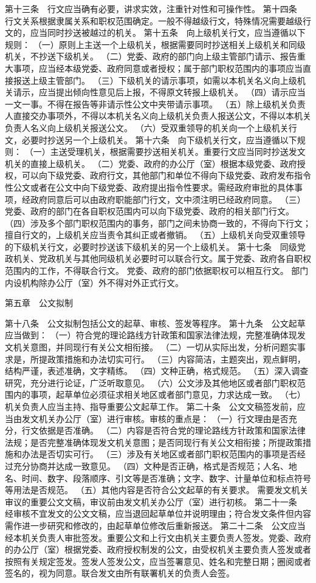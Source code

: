 \documentclass{gbt9704}
\begin{document}
第十三条　行文应当确有必要，讲求实效，注重针对性和可操作性。
第十四条　行文关系根据隶属关系和职权范围确定。一般不得越级行文，特殊情况需要越级行文的，应当同时抄送被越过的机关。
第十五条　向上级机关行文，应当遵循以下规则：
（一）原则上主送一个上级机关，根据需要同时抄送相关上级机关和同级机关，不抄送下级机关。
（二）党委、政府的部门向上级主管部门请示、报告重大事项，应当经本级党委、政府同意或者授权；属于部门职权范围内的事项应当直接报送上级主管部门。
（三）下级机关的请示事项，如需以本机关名义向上级机关请示，应当提出倾向性意见后上报，不得原文转报上级机关。
（四）请示应当一文一事。不得在报告等非请示性公文中夹带请示事项。
（五）除上级机关负责人直接交办事项外，不得以本机关名义向上级机关负责人报送公文，不得以本机关负责人名义向上级机关报送公文。
（六）受双重领导的机关向一个上级机关行文，必要时抄送另一个上级机关。
第十六条　向下级机关行文，应当遵循以下规则：
（一）主送受理机关，根据需要抄送相关机关。重要行文应当同时抄送发文机关的直接上级机关。
（二）党委、政府的办公厅（室）根据本级党委、政府授权，可以向下级党委、政府行文，其他部门和单位不得向下级党委、政府发布指令性公文或者在公文中向下级党委、政府提出指令性要求。需经政府审批的具体事项，经政府同意后可以由政府职能部门行文，文中须注明已经政府同意。
（三）党委、政府的部门在各自职权范围内可以向下级党委、政府的相关部门行文。
（四）涉及多个部门职权范围内的事务，部门之间未协商一致的，不得向下行文；擅自行文的，上级机关应当责令其纠正或者撤销。
（五）上级机关向受双重领导的下级机关行文，必要时抄送该下级机关的另一个上级机关。
第十七条　同级党政机关、党政机关与其他同级机关必要时可以联合行文。属于党委、政府各自职权范围内的工作，不得联合行文。
党委、政府的部门依据职权可以相互行文。
部门内设机构除办公厅（室）外不得对外正式行文。

第五章　公文拟制

第十八条　公文拟制包括公文的起草、审核、签发等程序。
第十九条　公文起草应当做到：
（一）符合党的理论路线方针政策和国家法律法规，完整准确体现发文机关意图，并同现行有关公文相衔接。
（二）一切从实际出发，分析问题实事求是，所提政策措施和办法切实可行。
（三）内容简洁，主题突出，观点鲜明，结构严谨，表述准确，文字精练。
（四）文种正确，格式规范。
（五）深入调查研究，充分进行论证，广泛听取意见。
（六）公文涉及其他地区或者部门职权范围内的事项，起草单位必须征求相关地区或者部门意见，力求达成一致。
（七）机关负责人应当主持、指导重要公文起草工作。
第二十条　公文文稿签发前，应当由发文机关办公厅（室）进行审核。审核的重点是：
（一）行文理由是否充分，行文依据是否准确。
（二）内容是否符合党的理论路线方针政策和国家法律法规；是否完整准确体现发文机关意图；是否同现行有关公文相衔接；所提政策措施和办法是否切实可行。
（三）涉及有关地区或者部门职权范围内的事项是否经过充分协商并达成一致意见。
（四）文种是否正确，格式是否规范；人名、地名、时间、数字、段落顺序、引文等是否准确；文字、数字、计量单位和标点符号等用法是否规范。
（五）其他内容是否符合公文起草的有关要求。
需要发文机关审议的重要公文文稿，审议前由发文机关办公厅（室）进行初核。
第二十一条　经审核不宜发文的公文文稿，应当退回起草单位并说明理由；符合发文条件但内容需作进一步研究和修改的，由起草单位修改后重新报送。
第二十二条　公文应当经本机关负责人审批签发。重要公文和上行文由机关主要负责人签发。党委、政府的办公厅（室）根据党委、政府授权制发的公文，由受权机关主要负责人签发或者按照有关规定签发。签发人签发公文，应当签署意见、姓名和完整日期；圈阅或者签名的，视为同意。联合发文由所有联署机关的负责人会签。
\end{document}
